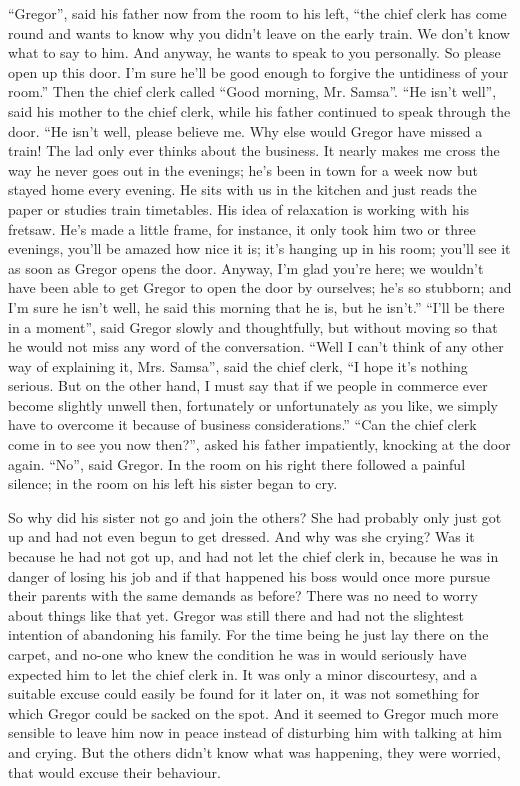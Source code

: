 “Gregor”, said his father now from the room to his left, “the chief
clerk has come round and wants to know why you didn’t leave on the
early train. We don’t know what to say to him. And anyway, he wants to
speak to you personally. So please open up this door. I’m sure he’ll be
good enough to forgive the untidiness of your room.” Then the chief
clerk called “Good morning, Mr. Samsa”. “He isn’t well”, said his
mother to the chief clerk, while his father continued to speak through
the door. “He isn’t well, please believe me. Why else would Gregor have
missed a train! The lad only ever thinks about the business. It nearly
makes me cross the way he never goes out in the evenings; he’s been in
town for a week now but stayed home every evening. He sits with us in
the kitchen and just reads the paper or studies train timetables. His
idea of relaxation is working with his fretsaw. He’s made a little
frame, for instance, it only took him two or three evenings, you’ll be
amazed how nice it is; it’s hanging up in his room; you’ll see it as
soon as Gregor opens the door. Anyway, I’m glad you’re here; we
wouldn’t have been able to get Gregor to open the door by ourselves;
he’s so stubborn; and I’m sure he isn’t well, he said this morning that
he is, but he isn’t.” “I’ll be there in a moment”, said Gregor slowly
and thoughtfully, but without moving so that he would not miss any word
of the conversation. “Well I can’t think of any other way of explaining
it, Mrs. Samsa”, said the chief clerk, “I hope it’s nothing serious.
But on the other hand, I must say that if we people in commerce ever
become slightly unwell then, fortunately or unfortunately as you like,
we simply have to overcome it because of business considerations.” “Can
the chief clerk come in to see you now then?”, asked his father
impatiently, knocking at the door again. “No”, said Gregor. In the room
on his right there followed a painful silence; in the room on his left
his sister began to cry.

So why did his sister not go and join the others? She had probably only
just got up and had not even begun to get dressed. And why was she
crying? Was it because he had not got up, and had not let the chief
clerk in, because he was in danger of losing his job and if that
happened his boss would once more pursue their parents with the same
demands as before? There was no need to worry about things like that
yet. Gregor was still there and had not the slightest intention of
abandoning his family. For the time being he just lay there on the
carpet, and no-one who knew the condition he was in would seriously
have expected him to let the chief clerk in. It was only a minor
discourtesy, and a suitable excuse could easily be found for it later
on, it was not something for which Gregor could be sacked on the spot.
And it seemed to Gregor much more sensible to leave him now in peace
instead of disturbing him with talking at him and crying. But the
others didn’t know what was happening, they were worried, that would
excuse their behaviour.

